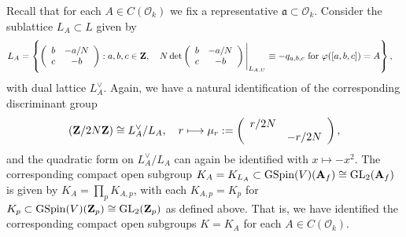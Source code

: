 \documentclass{amsart}
\theoremstyle{definition}
\theoremstyle{definition}
\theoremstyle{definition}
\begin{document}
Recall that for each $A \in C(\mathcal{O}_k)$ we fix a representative $\mathfrak{a} \subset \mathcal{O}_k$. Consider the sublattice $L_A \subset L$ given by 
\begin{align}\label{LAn=1} L_A &= \left\lbrace \left( \begin{array}{cc} b & - a/N \\ c & - b \end{array} \right) : a, b, c \in {\bf{Z}}, \quad
N \det \left( \begin{array}{cc} b & - a/N \\ c & - b \end{array} \right)  \Bigg\vert_{L_{A,U}} \equiv - q_{a,b,c} \text{ for } \varphi([a, b, c]) = A \right\rbrace,\end{align}
with dual lattice $L_A^{\vee}$.
Again, we have a natural identification of the corresponding discriminant group
\begin{align*} ({\bf{Z}}/2 N {\bf{Z}}) \cong L_A^{\vee}/L_A, \quad r \longmapsto \mu_r := \left( \begin{array}{cc} r/2N & ~~\\~& - r/2N \end{array} \right), \end{align*}
and the quadratic form on $L_A^{\vee}/L_A$ can again be identified with $x \mapsto -x^2$.
The corresponding compact open subgroup $K_A = K_{L_A} \subset \operatorname{GSpin}(V)({\bf{A}}_f) \cong \operatorname{GL}_2({\bf{A}}_f)$
is given by $K_A= \prod_p K_{A, p}$, with each $K_{A, p} = K_p$ for $K_p \subset \operatorname{GSpin}(V)({\bf{Z}}_p) \cong \operatorname{GL}_2({\bf{Z}}_p)$ 
as defined above. That is, we have identified the corresponding compact open subgroups $K = K_A$ for each $A \in C(\mathcal{O}_k)$.
\end{document}

